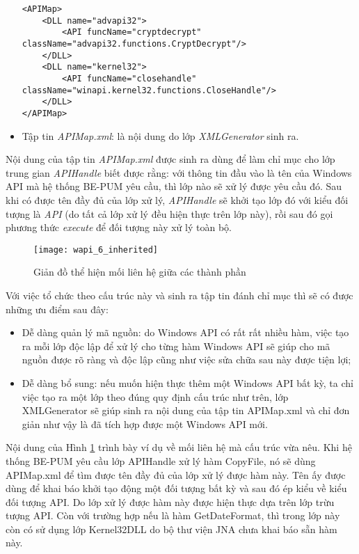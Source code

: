 \begin{itemize}
\lstset{language=HTML}
\begin{lstlisting}
<APIMap>
	<DLL name="advapi32">
		<API funcName="cryptdecrypt" 
className="advapi32.functions.CryptDecrypt"/>
	</DLL>
	<DLL name="kernel32">
		<API funcName="closehandle" 
className="winapi.kernel32.functions.CloseHandle"/>
	</DLL>
</APIMap>
\end{lstlisting}

	\item Tập tin \textit{APIMap.xml}: là nội dung do lớp \textit{XMLGenerator} sinh ra.
\end{itemize}

Nội dung của tập tin \textit{APIMap.xml} được sinh ra dùng để làm chỉ mục cho lớp trung gian \textit{APIHandle} biết được rằng: với thông tin đầu vào là tên của Windows API mà hệ thống BE-PUM yêu cầu, thì lớp nào sẽ xử lý được yêu cầu đó. Sau khi có được tên đầy đủ của lớp xử lý, \textit{APIHandle} sẽ khởi tạo lớp đó với kiểu đối tượng là \textit{API} (do tất cả lớp xử lý đều hiện thực trên lớp này), rồi sau đó gọi phương thức \textit{execute} để đối tượng này xử lý toàn bộ.

	\begin{figure}[H]
	\centering
		\texttt{[image: wapi\_6\_inherited]}
		\caption{Giản đồ thể hiện mối liên hệ giữa các thành phần}	
		\label{fig:wapi_6_inherited}		
	\end{figure}


Với việc tổ chức theo cấu trúc này và sinh ra tập tin đánh chỉ mục thì sẽ có được những ưu điểm sau đây:

\begin{itemize}
	\item Dễ dàng quản lý mã nguồn: do Windows API có rất rất nhiều hàm, việc tạo ra mỗi lớp độc lập để xử lý cho từng hàm Windows API sẽ giúp cho mã nguồn được rõ ràng và độc lập cũng như việc sửa chữa sau này được tiện lợi;

	\item Dễ dàng bổ sung: nếu muốn hiện thực thêm một Windows API bất kỳ, ta chỉ việc tạo ra một lớp theo đúng quy định cấu trúc như trên, lớp XMLGenerator sẽ giúp sinh ra nội dung của tập tin APIMap.xml và chỉ đơn giản như vậy là đã tích hợp được một Windows API mới.
\end{itemize}

Nội dung của Hình \ref{fig:wapi_6_inherited} trình bày ví dụ về mối liên hệ mà cấu trúc vừa nêu. Khi hệ thống BE-PUM yêu cầu lớp APIHandle xử lý hàm CopyFile, nó sẽ dùng APIMap.xml để tìm được tên đầy đủ của lớp xử lý được hàm này. Tên ấy được dùng để khai báo khởi tạo động một đối tượng bất kỳ và sau đó ép kiểu về kiểu đối tượng API. Do lớp xử lý được hàm này được hiện thực dựa trên lớp trừu tượng API. Còn với trường hợp nếu là hàm GetDateFormat, thì trong lớp này còn có sử dụng lớp Kernel32DLL do bộ thư viện JNA chưa khai báo sẵn hàm này.

